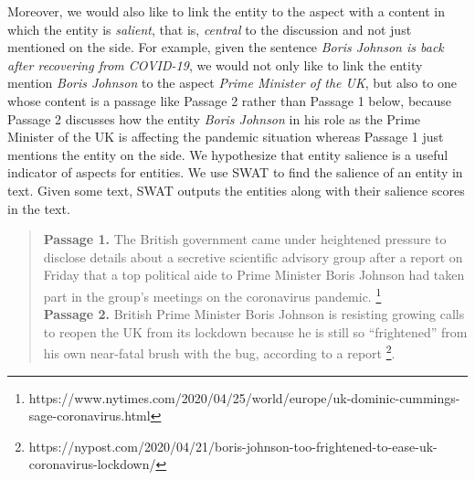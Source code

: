 \documentclass[sigconf,authordraft]{acmart}
\begin{document}
Moreover, we would also like to link the entity to the aspect with a content in which the entity is \textit{salient}, that is, \textit{central} to the discussion and not just mentioned on the side. For example, given the sentence \textit{Boris Johnson is back after recovering from COVID-19}, we would not only like to link the entity mention \textit{Boris Johnson} to the aspect \textit{Prime Minister of the UK}, but also to one whose content is a passage like Passage 2 rather than Passage 1 below, because Passage 2 discusses how the entity \textit{Boris Johnson} in his role as the Prime Minister of the UK is affecting the pandemic situation whereas Passage 1 just mentions the entity on the side. We hypothesize that entity salience is a useful indicator of aspects for entities. We use SWAT \cite{swat}  to find the salience of an entity in text. Given some text, SWAT outputs the entities along with their salience scores in the text.
\begin{quote}
\textbf{Passage 1.} The British government came under heightened pressure to disclose details about a secretive scientific advisory group after a report on Friday that a top political aide to Prime Minister Boris Johnson had taken part in the group’s meetings on the coronavirus pandemic. \footnote{https://www.nytimes.com/2020/04/25/world/europe/uk-dominic-cummings-sage-coronavirus.html}\\
\textbf{Passage 2.} British Prime Minister Boris Johnson is resisting growing calls to reopen the UK from its lockdown because he is still so “frightened” from his own near-fatal brush with the bug, according to a report \footnote{https://nypost.com/2020/04/21/boris-johnson-too-frightened-to-ease-uk-coronavirus-lockdown/}.
\end{quote}
\end{document}
